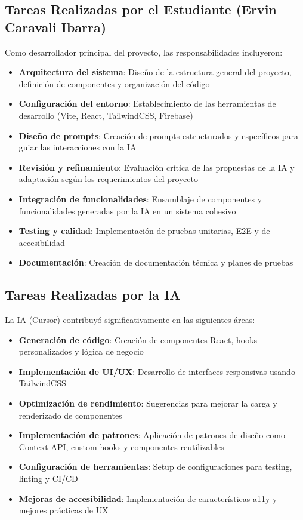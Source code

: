 \documentclass[12pt,a4paper]{article}
\begin{document}
\subsection{Tareas Realizadas por el Estudiante (Ervin Caravali Ibarra)}

Como desarrollador principal del proyecto, las responsabilidades incluyeron:

\begin{itemize}
    \item \textbf{Arquitectura del sistema}: Diseño de la estructura general del proyecto, definición de componentes y organización del código
    \item \textbf{Configuración del entorno}: Establecimiento de las herramientas de desarrollo (Vite, React, TailwindCSS, Firebase)
    \item \textbf{Diseño de prompts}: Creación de prompts estructurados y específicos para guiar las interacciones con la IA
    \item \textbf{Revisión y refinamiento}: Evaluación crítica de las propuestas de la IA y adaptación según los requerimientos del proyecto
    \item \textbf{Integración de funcionalidades}: Ensamblaje de componentes y funcionalidades generadas por la IA en un sistema cohesivo
    \item \textbf{Testing y calidad}: Implementación de pruebas unitarias, E2E y de accesibilidad
    \item \textbf{Documentación}: Creación de documentación técnica y planes de pruebas
\end{itemize}

\subsection{Tareas Realizadas por la IA}

La IA (Cursor) contribuyó significativamente en las siguientes áreas:

\begin{itemize}
    \item \textbf{Generación de código}: Creación de componentes React, hooks personalizados y lógica de negocio
    \item \textbf{Implementación de UI/UX}: Desarrollo de interfaces responsivas usando TailwindCSS
    \item \textbf{Optimización de rendimiento}: Sugerencias para mejorar la carga y renderizado de componentes
    \item \textbf{Implementación de patrones}: Aplicación de patrones de diseño como Context API, custom hooks y componentes reutilizables
    \item \textbf{Configuración de herramientas}: Setup de configuraciones para testing, linting y CI/CD
    \item \textbf{Mejoras de accesibilidad}: Implementación de características a11y y mejores prácticas de UX
\end{itemize}
\end{document}
